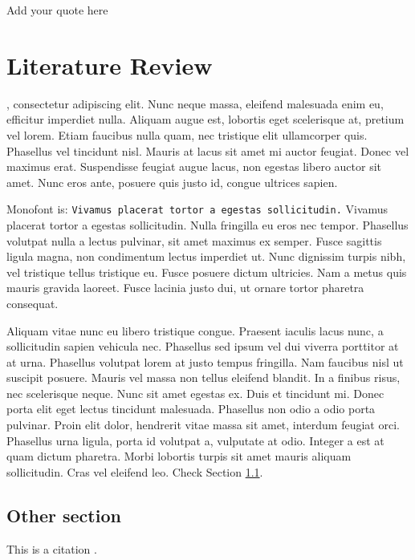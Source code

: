 \begin{savequote}[75mm]
Add your quote here
\end{savequote}

\chapter{Literature Review}
\label{literature}
, consectetur adipiscing elit. Nunc neque massa, eleifend malesuada enim eu, efficitur imperdiet nulla. Aliquam augue est, lobortis eget scelerisque at, pretium vel lorem. Etiam faucibus nulla quam, nec tristique elit ullamcorper quis. Phasellus vel tincidunt nisl. Mauris at lacus sit amet mi auctor feugiat. Donec vel maximus erat. Suspendisse feugiat augue lacus, non egestas libero auctor sit amet. Nunc eros ante, posuere quis justo id, congue ultrices sapien.

Monofont is: \texttt{Vivamus placerat tortor a egestas sollicitudin.}
Vivamus placerat tortor a egestas sollicitudin. Nulla fringilla eu eros nec tempor. Phasellus volutpat nulla a lectus pulvinar, sit amet maximus ex semper. Fusce sagittis ligula magna, non condimentum lectus imperdiet ut. Nunc dignissim turpis nibh, vel tristique tellus tristique eu. Fusce posuere dictum ultricies. Nam a metus quis mauris gravida laoreet. Fusce lacinia justo dui, ut ornare tortor pharetra consequat.

Aliquam vitae nunc eu libero tristique congue. Praesent iaculis lacus nunc, a sollicitudin sapien vehicula nec. Phasellus sed ipsum vel dui viverra porttitor at at urna. Phasellus volutpat lorem at justo tempus fringilla. Nam faucibus nisl ut suscipit posuere. Mauris vel massa non tellus eleifend blandit. In a finibus risus, nec scelerisque neque. Nunc sit amet egestas ex. Duis et tincidunt mi. Donec porta elit eget lectus tincidunt malesuada. Phasellus non odio a odio porta pulvinar. Proin elit dolor, hendrerit vitae massa sit amet, interdum feugiat orci. Phasellus urna ligula, porta id volutpat a, vulputate at odio. Integer a est at quam dictum pharetra. Morbi lobortis turpis sit amet mauris aliquam sollicitudin. Cras vel eleifend leo.
Check Section \ref{Other section}.

\clearpage

\section{Other section}
\label{Other section}
This is a citation \citep{testcitation}.
\medskip

